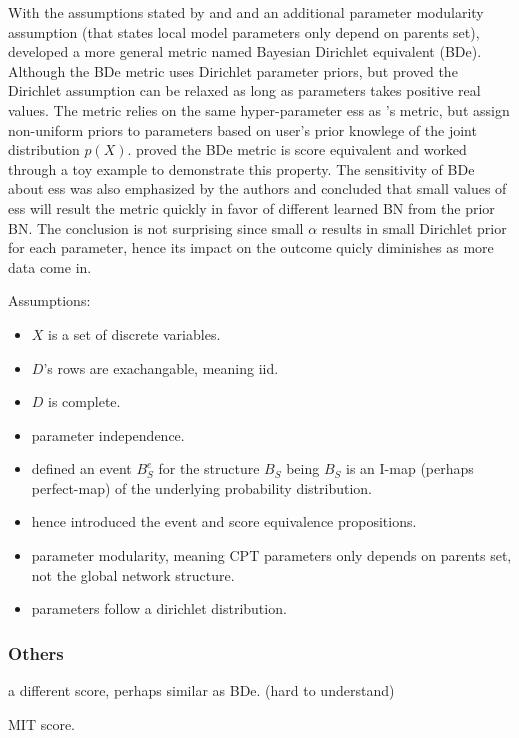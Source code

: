 With the assumptions stated by \cite{cooper1992Bayesian} and \cite{buntine1991classifiers} and an additional parameter modularity assumption (that states local model parameters only depend on parents set), \cite{heckerman1995learning} developed a more general metric named Bayesian Dirichlet equivalent (BDe). Although the BDe metric uses Dirichlet parameter priors, but \cite{heckerman1995learning} proved the Dirichlet assumption can be relaxed as long as parameters takes positive real values. The metric relies on the same hyper-parameter ess as \cite{buntine1991theory}'s metric, but assign non-uniform priors to parameters based on user's prior knowlege of the joint distribution $p(X)$. \cite{heckerman1995learning} proved the BDe metric is score equivalent and worked through a toy example to demonstrate this property.  The sensitivity of BDe about ess was also emphasized by the authors and concluded that small values of ess will result the metric quickly in favor of different learned BN from the prior BN. The conclusion is not surprising since small $\alpha$ results in small Dirichlet prior for each parameter, hence its impact on the outcome quicly diminishes as more data come in. 

Assumptions:
\begin{itemize}
\item $X$ is a set of discrete variables. 
\item $D$'s rows are exachangable, meaning iid.
\item $D$ is complete. 
\item parameter independence. 
\item defined an event $B_S^e$ for the structure $B_S$ being $B_S$ is an I-map (perhaps perfect-map) of the underlying probability distribution. 
\item hence introduced the event and score equivalence propositions. 
\item parameter modularity, meaning CPT parameters only depends on parents set, not the global network structure. 
\item parameters follow a dirichlet distribution. 
\end{itemize}

\subsubsection{Others}
\cite{spiegelhalter1993bayesian} a different score, perhaps similar as BDe. (hard to understand)

\cite{campos2006scoring} MIT score. 

